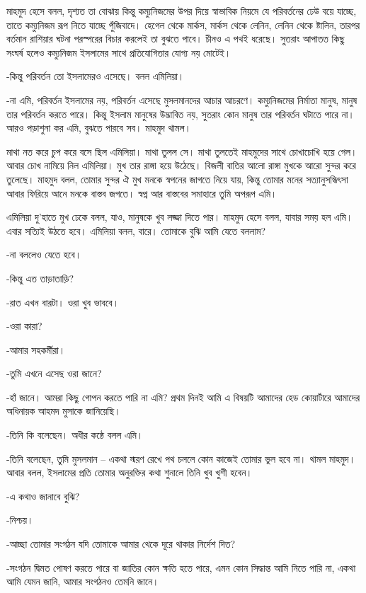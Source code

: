 \documentclass[
]{book}
\begin{document}
মাহমুদ হেসে বলল, দৃশ্যত তা বোঝায় কিন্তু কম্যুনিজমের উপর দিয়ে স্বাভাবিক নিয়মে যে পরিবর্তনের ঢেউ বয়ে যাচ্ছে, তাতে কম্যুনিজম রূপ নিতে যাচ্ছে পুঁজিবাদে। হেগেল থেকে মার্কস, মার্কস থেকে লেনিন, লেনিন থেকে ষ্টালিন, তারপর বর্তমান রাশিয়ার ঘটনা পরস্পরের বিচার করলেই তা বুঝতে পাবে। চীনও এ পথই ধরেছে। সুতরাং আপাতত কিছু সংঘর্ষ হলেও কম্যুনিজম ইসলামের সাথে প্রতিযোগিতার যোগ্য নয় মোটেই।

-কিন্তু পরিবর্তন তো ইসলামেরও এসেছে। বলল এমিলিয়া।

-না এমি, পরিবর্তন ইসলামের নয়, পরিবর্তন এসেছে মুসলমানদের আচার আচরণে। কম্যুনিজমের নির্মাতা মানুষ, মানুষ তার পরিবর্তন করতে পারে। কিন্তু ইসলাম মানুষের উদ্ভাবিত নয়, সুতরাং কোন মানুষ তার পরিবর্তন ঘটাতে পারে না। আরও পড়াশুনা কর এমি, বুঝতে পারবে সব। মাহমুদ থামল।

মাথা নত করে চুপ করে বসে ছিল এমিলিয়া। মাথা তুলল সে। মাথা তুলতেই মাহমুদের সাথে চোখাচোখি হয়ে গেল। আবার চোখ নামিয়ে নিল এমিলিয়া। মুখ তার রাঙ্গা হয়ে উঠেছে। বিজলী বাতির আলো রাঙ্গা মুখকে আরো সুন্দর করে তুলেছে। মাহমুদ বলল, তোমার সুন্দর ঐ মুখ মনকে স্বপনের জাগতে নিয়ে যায়, কিন্তু তোমার মনের সত্যানুসন্ধিৎসা আবার ফিরিয়ে আনে মনকে বাস্তব জগতে। স্বপ্ন আর বাস্তবের সমাহারে তুমি অপরূপ এমি।

এমিলিয়া দু'হাতে মুখ ঢেকে বলল, যাও, মানুষকে খুব লজ্জা দিতে পার। মাহমুদ হেসে বলল, যাবার সময় হল এমি। এবার সত্যিই উঠতে হবে। এমিলিয়া বলল, বারে। তোমাকে বুঝি আমি যেতে বললাম?

-না বললেও যেতে হবে।

-কিন্তু এত তাড়াতাড়ি?

-রাত এখন বারটা। ওরা খুব ভাববে।

-ওরা কারা?

-আমার সহকর্মীরা।

-তুমি এখনে এসেছ ওরা জানে?

-হাঁ জানে। আমরা কিছু গোপন করতে পারি না এমি? প্রথম দিনই আমি এ বিষয়টি আমাদের হেড কোয়ার্টারে আমাদের অধিনায়ক আহমদ মুসাকে জানিয়েছি।

-তিনি কি বলেছেন। অধীর কন্ঠে বলল এমি।

-তিনি বলেছেন, তুমি মুসলমান -- একথা স্মরণ রেখে পথ চললে কোন কাজেই তোমার ভুল হবে না। থামল মাহমুদ। আবার বলল, ইসলামের প্রতি তোমার অনুরক্তির কথা শুনালে তিনি খুব খুশী হবেন।

-এ কথাও জানাবে বুঝি?

-নিশ্চয়।

-আচ্ছা তোমার সংগঠন যদি তোমাকে আমার থেকে দূরে থাকার নির্দেশ দিত?

-সংগঠন দ্বিমত পোষণ করতে পারে বা জাতির কোন ক্ষতি হতে পারে, এমন কোন সিদ্ধান্ত আমি নিতে পারি না, একথা আমি যেমন জানি, আমার সংগঠনও তেমনি জানে।
\end{document}
